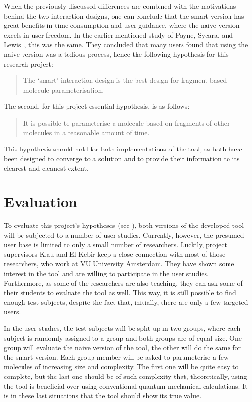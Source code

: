 When the previously discussed differences are combined with the motivations behind the two interaction designs, one can conclude that the smart version has great benefits in time consumption and user guidance, where the naive version excels in user freedom. In the earlier mentioned study of Payne, Sycara, and Lewis~\cite{payne2000varying}, this was the same. They concluded that many users found that using the naive version was a tedious process, hence the following hypothesis for this research project:
\begin{quote}
The `smart' interaction design is the best design for fragment-based molecule parameterisation.
\end{quote}

The second, for this project essential hypothesis, is as follows:
\begin{quote}
It is possible to parameterise a molecule based on fragments of other molecules in a reasonable amount of time.
\end{quote}
This hypothesis should hold for both implementations of the tool, as both have been designed to converge to a solution and to provide their information to its clearest and cleanest extent.


\section{Evaluation}

To evaluate this project's hypotheses~(see ), both versions of the developed tool will be subjected to a number of user studies. Currently, however, the presumed user base is limited to only a small number of researchers. Luckily, project supervisors Klau and El-Kebir keep a close connection with most of those researchers, who work at VU University Amsterdam. They have shown some interest in the tool and are willing to participate in the user studies. Furthermore, as some of the researchers are also teaching, they can ask some of their students to evaluate the tool as well. This way, it is still possible to find enough test subjects, despite the fact that, initially, there are only a few targeted users.

In the user studies, the test subjects will be split up in two groups, where each subject is randomly assigned to a group and both groups are of equal size. One group will evaluate the naive version of the tool, the other will do the same for the smart version. Each group member will be asked to parameterise a few molecules of increasing size and complexity. The first one will be quite easy to complete, but the last one should be of such complexity that, theoretically, using the tool is beneficial over using conventional quantum mechanical calculations. It is in these last situations that the tool should show its true value.

